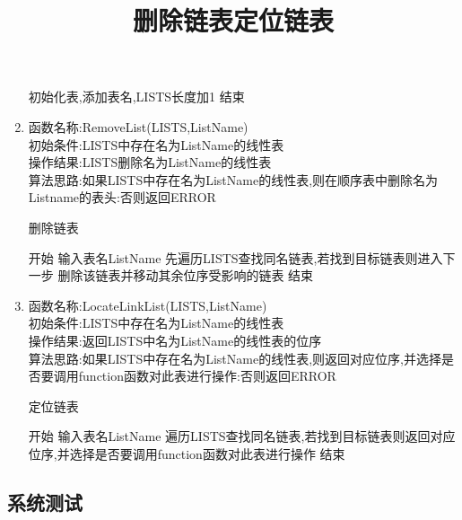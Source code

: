 \documentclass[supercite]{HustGraduPaper}
\theoremstyle{definition}
\begin{document}
\begin{enumerate}
\begin{algorithm}[htb]
\begin{algorithmic}[1]
			      \State 初始化表,添加表名,LISTS长度加1
			      \State 结束
		      \end{algorithmic}\label{L18}
	      \end{algorithm}
	\item 函数名称:RemoveList(LISTS,ListName)\\
	      初始条件:LISTS中存在名为ListName的线性表\\
	      操作结果:LISTS删除名为ListName的线性表\\
	      算法思路:如果LISTS中存在名为ListName的线性表,则在顺序表中删除名为Listname的表头:否则返回ERROR
	      \begin{algorithm}[htb]
		      \title{删除链表}
		      \caption{删除链表}
		      \begin{algorithmic}[1]
			      \State 开始
			      \State 输入表名ListName
			      \State 先遍历LISTS查找同名链表,若找到目标链表则进入下一步
			      \State 删除该链表并移动其余位序受影响的链表
			      \State 结束
		      \end{algorithmic}\label{L19}
	      \end{algorithm}
	      \newpage
	\item 函数名称:LocateLinkList(LISTS,ListName)\\
	      初始条件:LISTS中存在名为ListName的线性表\\
	      操作结果:返回LISTS中名为ListName的线性表的位序\\
	      算法思路:如果LISTS中存在名为ListName的线性表,则返回对应位序,并选择是否要调用function函数对此表进行操作:否则返回ERROR
	      \begin{algorithm}[htb]
		      \title{定位链表}
		      \caption{定位链表}
		      \begin{algorithmic}[1]
			      \State 开始
			      \State 输入表名ListName
			      \State 遍历LISTS查找同名链表,若找到目标链表则返回对应位序,并选择是否要调用function函数对此表进行操作
			      \State 结束
		      \end{algorithmic}\label{L20}
	      \end{algorithm}
\end{enumerate}
\subsection{系统测试}
\end{document}
